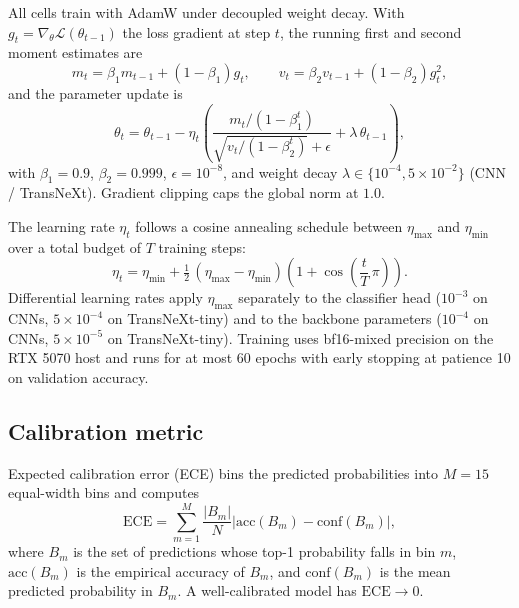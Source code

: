 All cells train with AdamW \cite{loshchilov2017adamw} under decoupled
weight decay. With $g_t = \nabla_\theta \mathcal{L}(\theta_{t-1})$ the
loss gradient at step $t$, the running first and second moment estimates
are
\begin{equation}
  m_t = \beta_1 m_{t-1} + (1 - \beta_1) g_t,
  \qquad
  v_t = \beta_2 v_{t-1} + (1 - \beta_2) g_t^{2},
  \label{eq:adamw_moments}
\end{equation}
and the parameter update is
\begin{equation}
  \theta_t = \theta_{t-1} - \eta_t \!\left(
    \frac{m_t / (1 - \beta_1^{t})}{\sqrt{v_t / (1 - \beta_2^{t})} + \epsilon}
    + \lambda \, \theta_{t-1}
  \right),
  \label{eq:adamw}
\end{equation}
with $\beta_1 = 0.9$, $\beta_2 = 0.999$, $\epsilon = 10^{-8}$, and weight
decay $\lambda \in \{10^{-4}, 5 \times 10^{-2}\}$ (CNN / TransNeXt).
Gradient clipping caps the global norm at $1.0$.

The learning rate $\eta_t$ follows a cosine annealing schedule
\cite{loshchilov2017sgdr} between $\eta_{\max}$ and $\eta_{\min}$ over a
total budget of $T$ training steps:
\begin{equation}
  \eta_t = \eta_{\min} + \tfrac{1}{2}\, (\eta_{\max} - \eta_{\min}) \!\left(
    1 + \cos\!\left( \frac{t}{T}\, \pi \right)
  \right).
  \label{eq:cosine}
\end{equation}
Differential learning rates apply $\eta_{\max}$ separately to the
classifier head ($10^{-3}$ on CNNs, $5 \times 10^{-4}$ on TransNeXt-tiny)
and to the backbone parameters ($10^{-4}$ on CNNs, $5 \times 10^{-5}$ on
TransNeXt-tiny). Training uses bf16-mixed precision on the RTX 5070 host
and runs for at most 60 epochs with early stopping at patience 10 on
validation accuracy.

\subsection{Calibration metric}
\label{sec:design:ece}

Expected calibration error (ECE) \cite{naeini2015ece, guo2017oncalibration}
bins the predicted probabilities into $M = 15$ equal-width bins and computes
\begin{equation}
  \mathrm{ECE} = \sum_{m=1}^{M} \frac{|B_m|}{N} \left| \mathrm{acc}(B_m) - \mathrm{conf}(B_m) \right|,
  \label{eq:ece}
\end{equation}
where $B_m$ is the set of predictions whose top-1 probability falls in bin
$m$, $\mathrm{acc}(B_m)$ is the empirical accuracy of $B_m$, and
$\mathrm{conf}(B_m)$ is the mean predicted probability in $B_m$. A
well-calibrated model has $\mathrm{ECE} \to 0$.

